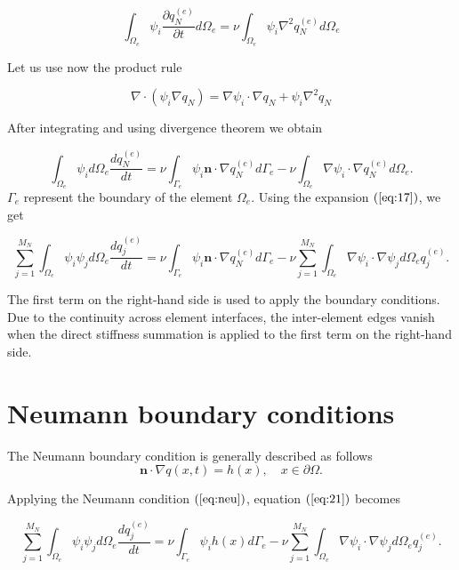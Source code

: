 \documentclass[11pt,a4paper]{article}
\begin{document}
	\begin{equation}
	    \int_{\Omega_e}\psi_i\dfrac{\partial q_N^{(e)}}{\partial t}d{\Omega_e} = \nu\int_{\Omega_e}\psi_i\nabla^2 q_N^{(e)}d{\Omega_e}
	\end{equation}
	
	Let us use now the product rule
	
	$$\nabla\cdot(\psi_i\nabla q_N) = \nabla\psi_i\cdot\nabla q_N + \psi_i\nabla^2 q_N$$
	
	After integrating and using divergence theorem we obtain
	
	\begin{equation}
	    \int_{\Omega_e}\psi_id{\Omega_e}\dfrac{d q_N^{(e)}}{dt} = \nu\int_{\Gamma_e}\psi_i\mathbf{n} \cdot\nabla q_N^{(e)}d{\Gamma_e} - \nu\int_{\Omega_e}\nabla\psi_i\cdot\nabla q_N^{(e)} d{\Omega_e}.
	    \label{eq:20}
	\end{equation}
	 $\Gamma_e$ represent the boundary of the element $\Omega_e$. Using the expansion $(\ref{eq:17})$, we get
	 
	 \begin{equation}
	    \sum_{j=1}^{M_N}\int_{\Omega_e}\psi_i\psi_jd{\Omega_e}\dfrac{d q_j^{(e)}}{dt} = \nu\int_{\Gamma_e}\psi_i\mathbf{n} \cdot\nabla q_N^{(e)}d{\Gamma_e} - \nu\sum_{j=1}^{M_N}\int_{\Omega_e}\nabla\psi_i\cdot\nabla \psi_j d{\Omega_e}q_j^{(e)}.
	    \label{eq:21}
	\end{equation}
	
	
	The first term on the right-hand side is used to apply the boundary conditions. Due to the continuity across element interfaces, the inter-element edges vanish when the direct stiffness summation is applied to the first term on the right-hand side.
	
	\section{Neumann boundary conditions}
	    
	    The Neumann boundary condition is generally described as follows
		\begin{equation}
			\label{eq:neu}
				\mathbf{n}\cdot\nabla q(x,t)  = h(x), \quad x\in \partial \Omega.
		\end{equation}
		
		\noindent Applying the Neumann condition $(\ref{eq:neu})$, equation $(\ref{eq:21})$ becomes 
	    
	    \begin{equation}
	    \sum_{j=1}^{M_N}\int_{\Omega_e}\psi_i\psi_jd{\Omega_e}\dfrac{d q_j^{(e)}}{dt} = \nu\int_{\Gamma_e}\psi_ih(x)d{\Gamma_e} - \nu\sum_{j=1}^{M_N}\int_{\Omega_e}\nabla\psi_i\cdot\nabla \psi_j d{\Omega_e}q_j^{(e)}.
	\end{equation}
	    
\end{document}

